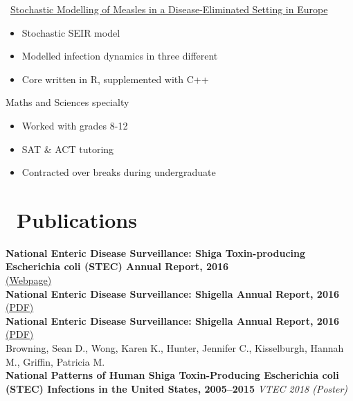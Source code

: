 \documentclass{resume}
\begin{document}
\faGithubSquare\ \href{https://github.com/beansrowning/modelling}{Stochastic Modelling of Measles in a Disease-Eliminated Setting in Europe}
\begin{itemize}
  \item Stochastic SEIR model
  \item Modelled infection dynamics in three different 
  \item Core written in R, supplemented with C++
\end{itemize}

Maths and Sciences specialty
\begin{itemize}
  \item Worked with grades 8-12
  \item SAT \& ACT tutoring
  \item Contracted over breaks during undergraduate
\end{itemize}

\section{\faFileTextO\ Publications}

\textbf{National Enteric Disease Surveillance: Shiga Toxin-producing Escherichia coli (STEC) Annual Report, 2016} \\
\href{https://www.cdc.gov/ecoli/surv2016/index.html}{(Webpage)} \\

\textbf{National Enteric Disease Surveillance: Shigella Annual Report, 2016} \\
\href{https://www.cdc.gov/nationalsurveillance/pdfs/LEDS-Shig-2016-REPORT-508.pdf}{(PDF)} \\

\textbf{National Enteric Disease Surveillance: Shigella Annual Report, 2016} \\
\href{https://www.cdc.gov/nationalsurveillance/pdfs/2016-Salmonella-report-508.pdf}{(PDF)} \\

Browning, Sean D., Wong, Karen K., Hunter, Jennifer C., Kisselburgh, Hannah M., Griffin, Patricia M. \\ 
\textbf{National Patterns of Human Shiga Toxin-Producing Escherichia coli (STEC) Infections in the United States, 2005–2015} \textit{VTEC 2018 (Poster)} \\
\end{document}
